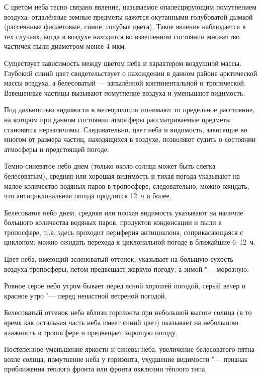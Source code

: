 С цветом неба тесно связано явление, называемое опалесцирующим
помутнением воздуха: отдалённые земные предметы кажется окутанными
голубоватой дымкой (рассеянные фиолетовые, синие, голубые
цвета). Такое явление наблюдается в тех случаях, когда в воздухе
находится во взвешенном состоянии множество частичек пыли диаметром
менее 4 мкм.

Существует зависимость между цветом неба и характером воздушной
массы. Глубокий синий цвет свидетельствует о нахождении в данном
районе арктической массы воздуха, а белесоватый — запылённой
континентальной и тропической. Взвешенные частицы вызывают помутнение
воздуха и уменьшают видимость.

Под дальностью видимости в метеорологии понимают то предельное
расстояние, на котором при данном состоянии атмосферы рассматриваемые
предметы становятся неразличимы. Следовательно, цвет неба и видимость,
зависящие во многом от размера частиц, находящихся в воздухе,
позволяют судить о состоянии атмосферы и предстоящей погоде.

 Темно-синеватое небо днем (только около солнца может быть
слегка белесоватым), средняя или хорошая видимость и тихая погода
указывают на малое количество водяных паров в тропосфере,
следовательно, можно ожидать, что антициклональная погода продлится
12~ч и более.

 Белесоватое небо днем, средняя или плохая видимость указывают
на наличие большого количества водяных паров, продуктов конденсации и
пыли в тропосфере, т.\=,е. здесь проходит периферия антициклона,
соприкасающаяся с циклоном: можно ожидать перехода к циклональной
погоде в ближайшие 6--12~ч.

 Цвет неба, имеющий зеленоватый оттенок, указывает на большую
сухость воздуха тропосферы; летом предвещает жаркую погоду, а зимой "---
морозную.

 Ровное серое небо утром бывает перед ясной хорошей погодой,
серый вечер и красное утро "--- перед ненастной ветреной погодой.

 Белесоватый оттенок неба вблизи горизонта при небольшой высоте
солнца (в то время как остальная часть неба имеет синий цвет)
оказывает на небольшою влажность в тропосфере и предвещает хорошую
погоду.

 Постепенное уменьшение яркости и синевы неба, увеличение
белесоватого пятна возле солнца, помутнение неба у горизонта,
ухудшение видимости "--- признак приближения тёплого фронта или фронта
окклюзии тёплого типа.

